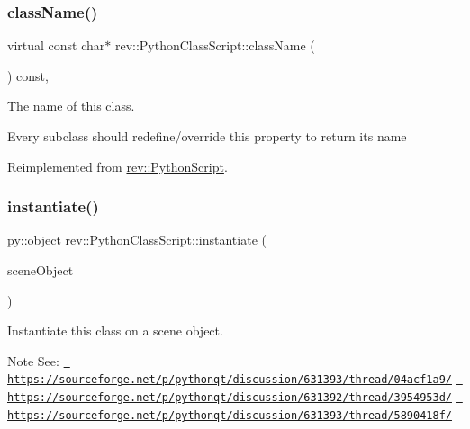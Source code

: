 \subsubsection{\texorpdfstring{className()}{className()}}
{\footnotesize\ttfamily virtual const char$\ast$ rev\+::\+Python\+Class\+Script\+::class\+Name (\begin{DoxyParamCaption}{ }\end{DoxyParamCaption}) const\hspace{0.3cm}{\ttfamily [inline]}, {\ttfamily [virtual]}}



The name of this class. 

Every subclass should redefine/override this property to return its name 

Reimplemented from \mbox{\hyperlink{classrev_1_1_python_script_ac593ea8f3beeb031d81837b1306bf6ba}{rev\+::\+Python\+Script}}.

\mbox{\label{classrev_1_1_python_class_script_a14a31154d6bc1d2ac782ab5f24f7f40b}} 
\subsubsection{\texorpdfstring{instantiate()}{instantiate()}}
{\footnotesize\ttfamily py\+::object rev\+::\+Python\+Class\+Script\+::instantiate (\begin{DoxyParamCaption}\item[{const std\+::shared\+\_\+ptr$<$ \mbox{\hyperlink{classrev_1_1_scene_object}{Scene\+Object}} $>$ \&}]{scene\+Object }\end{DoxyParamCaption})}



Instantiate this class on a scene object. 

\begin{DoxyNote}{Note}
See\+: \href{https://sourceforge.net/p/pythonqt/discussion/631393/thread/04acf1a9/}{\texttt{ https\+://sourceforge.\+net/p/pythonqt/discussion/631393/thread/04acf1a9/}} \href{https://sourceforge.net/p/pythonqt/discussion/631392/thread/3954953d/}{\texttt{ https\+://sourceforge.\+net/p/pythonqt/discussion/631392/thread/3954953d/}} \href{https://sourceforge.net/p/pythonqt/discussion/631393/thread/5890418f/}{\texttt{ https\+://sourceforge.\+net/p/pythonqt/discussion/631393/thread/5890418f/}} 
\end{DoxyNote}
\mbox{\label{classrev_1_1_python_class_script_a3e596d1eec111c02d431496f6a750701}} 
